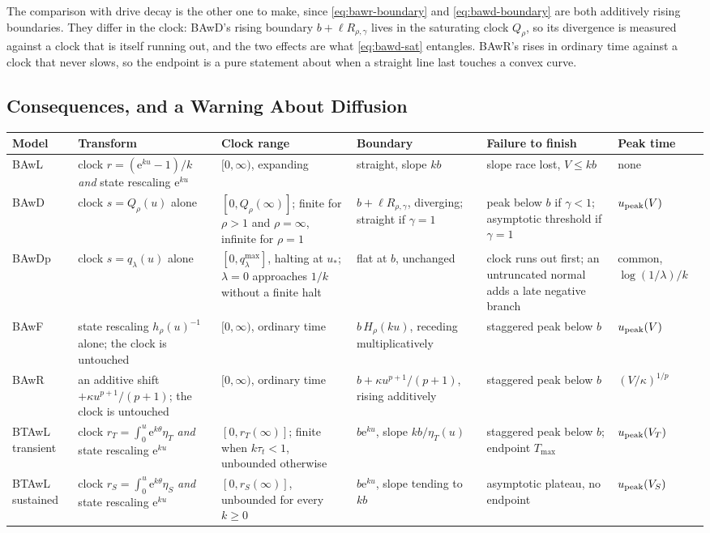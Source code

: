 \documentclass[12pt]{article}
\newcommand{\e}{\mathrm{e}}
\theoremstyle{remark}
\begin{document}
The comparison with drive decay is the other one to make, since
\eqref{eq:bawr-boundary} and \eqref{eq:bawd-boundary} are both additively
rising boundaries. They differ in the clock: BAwD's rising boundary $b+\ell R_{\rho,\gamma}$ lives in the saturating clock $Q_\rho$, so its divergence is measured against a clock that is itself running out, and the two effects are what \eqref{eq:bawd-sat} entangles. BAwR's rises in ordinary time against a clock that never slows, so the endpoint is a pure statement about when a straight line last touches a convex curve.

\subsection{Consequences, and a Warning About Diffusion}
\begin{center}
\small
\begin{tabular}{L{0.075\textwidth}L{0.155\textwidth}L{0.16\textwidth}L{0.14\textwidth}L{0.16\textwidth}L{0.095\textwidth}}
\toprule
Model & Transform & Clock range & Boundary & Failure to finish & Peak time \\
\midrule
BAwL & clock $r=(\e^{ku}-1)/k$ \emph{and} state rescaling $\e^{ku}$ &
$[0,\infty)$, expanding & straight, slope $kb$ &
slope race lost, $V\le kb$ & none \\
\addlinespace
BAwD & clock $s=Q_\rho(u)$ alone &
$[0,Q_\rho(\infty)]$; finite for $\rho>1$ and $\rho=\infty$, infinite for
$\rho=1$ &
$b+\ell R_{\rho,\gamma}$, diverging; straight if $\gamma=1$ &
peak below $b$ if $\gamma<1$; asymptotic threshold if $\gamma=1$ &
$u_{\rm peak}(V)$ \\
\addlinespace
BAwDp & clock $s=q_\lambda(u)$ alone &
$[0,q_\lambda^{\max}]$, halting at $u_{*}$; $\lambda=0$ approaches $1/k$
without a finite halt &
flat at $b$, unchanged &
clock runs out first; an untruncated normal adds a late negative branch &
common, $\log(1/\lambda)/k$ \\
\addlinespace
BAwF & state rescaling $h_\rho(u)^{-1}$ alone; the clock is untouched &
$[0,\infty)$, ordinary time & $b\,H_\rho(ku)$, receding multiplicatively &
staggered peak below $b$ & $u_{\rm peak}(V)$ \\
\addlinespace
BAwR & an additive shift $+\kappa u^{p+1}/(p+1)$; the clock is untouched &
$[0,\infty)$, ordinary time & $b+\kappa u^{p+1}/(p+1)$, rising additively &
staggered peak below $b$ & $(V/\kappa)^{1/p}$ \\
\addlinespace
BTAwL transient & clock $r_T=\int_0^u\e^{k\theta}\eta_T$ \emph{and} state
rescaling $\e^{ku}$ &
$[0,r_T(\infty)]$; finite when $k\tau_t<1$, unbounded otherwise &
$b\e^{ku}$, slope $kb/\eta_T(u)$ &
staggered peak below $b$; endpoint $T_{\max}$ &
$u_{\rm peak}(V_T)$ \\
\addlinespace
BTAwL sustained & clock $r_S=\int_0^u\e^{k\theta}\eta_S$ \emph{and} state
rescaling $\e^{ku}$ &
$[0,r_S(\infty)]$, unbounded for every $k\ge0$ &
$b\e^{ku}$, slope tending to $kb$ &
asymptotic plateau, no endpoint &
$u_{\rm peak}(V_S)$ \\
\bottomrule
\end{tabular}
\end{center}
\end{document}

